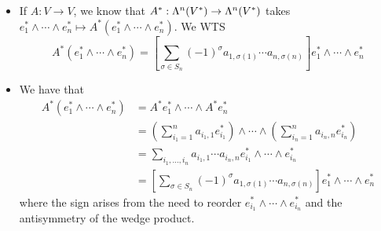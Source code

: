 \documentclass[../notes.tex]{subfiles}
\begin{document}
\begin{itemize}
    \begin{itemize}
        \item If $A:V\to V$, we know that $A^*:\lam[n]{V^*}\to\lam[n]{V^*}$ takes $e_1^*\wedge\cdots\wedge e_n^*\mapsto A^*(e_1^*\wedge\cdots\wedge e_n^*)$. We WTS
        \begin{equation*}
            A^*(e_1^*\wedge\cdots\wedge e_n^*) = \left[ \sum_{\sigma\in S_n}(-1)^\sigma a_{1,\sigma(1)}\cdots a_{n,\sigma(n)} \right]e_1^*\wedge\cdots\wedge e_n^*
        \end{equation*}
        \item We have that
        \begin{align*}
            A^*(e_1^*\wedge\cdots\wedge e_n^*) &= A^*e_1^*\wedge\cdots\wedge A^*e_n^*\\
            &= \left( \sum_{i_1=1}^na_{i_1,1}e_{i_1}^* \right)\wedge\cdots\wedge\left( \sum_{i_n=1}^na_{i_n,n}e_{i_n}^* \right)\\
            &= \sum_{i_1,\dots,i_n}a_{i_1,1}\cdots a_{i_n,n}e_{i_1}^*\wedge\cdots\wedge e_{i_n}^*\\
            &= \left[ \sum_{\sigma\in S_n}(-1)^\sigma a_{1,\sigma(1)}\cdots a_{n,\sigma(n)} \right]e_1^*\wedge\cdots\wedge e_n^*
        \end{align*}
        where the sign arises from the need to reorder $e_{i_1}^*\wedge\cdots\wedge e_{i_n}^*$ and the antisymmetry of the wedge product.
    \end{itemize}
\end{itemize}
\end{document}
